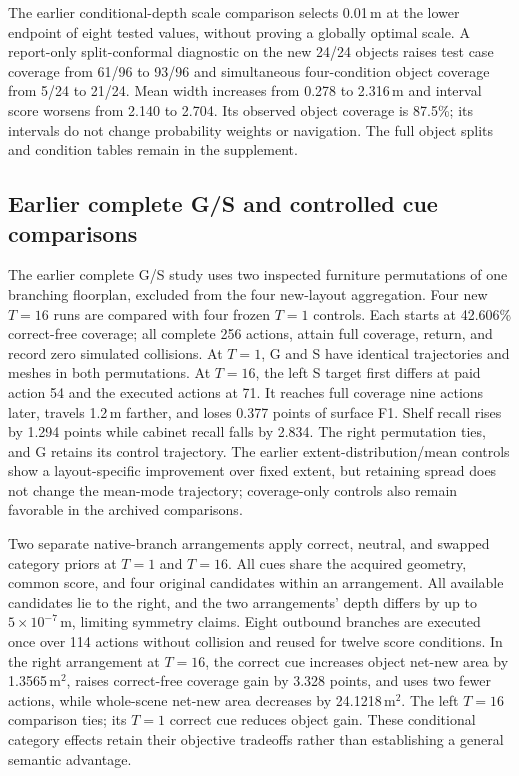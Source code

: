 The earlier conditional-depth scale comparison selects 0.01\,m at the lower endpoint of eight tested values, without proving a globally optimal scale. A report-only split-conformal diagnostic on the new 24/24 objects raises test case coverage from 61/96 to 93/96 and simultaneous four-condition object coverage from 5/24 to 21/24. Mean width increases from 0.278 to 2.316\,m and interval score worsens from 2.140 to 2.704. Its observed object coverage is 87.5\%; its intervals do not change probability weights or navigation. The full object splits and condition tables remain in the supplement.

\subsection{Earlier complete G/S and controlled cue comparisons}
The earlier complete G/S study uses two inspected furniture permutations of one branching floorplan, excluded from the four new-layout aggregation. Four new $T=16$ runs are compared with four frozen $T=1$ controls. Each starts at 42.606\% correct-free coverage; all complete 256 actions, attain full coverage, return, and record zero simulated collisions. At $T=1$, G and S have identical trajectories and meshes in both permutations. At $T=16$, the left S target first differs at paid action 54 and the executed actions at 71. It reaches full coverage nine actions later, travels 1.2\,m farther, and loses 0.377 points of surface F1. Shelf recall rises by 1.294 points while cabinet recall falls by 2.834. The right permutation ties, and G retains its control trajectory. The earlier extent-distribution/mean controls show a layout-specific improvement over fixed extent, but retaining spread does not change the mean-mode trajectory; coverage-only controls also remain favorable in the archived comparisons.


Two separate native-branch arrangements apply correct, neutral, and swapped category priors at $T=1$ and $T=16$. All cues share the acquired geometry, common score, and four original candidates within an arrangement. All available candidates lie to the right, and the two arrangements' depth differs by up to $5\times10^{-7}$\,m, limiting symmetry claims. Eight outbound branches are executed once over 114 actions without collision and reused for twelve score conditions. In the right arrangement at $T=16$, the correct cue increases object net-new area by 1.3565\,m$^2$, raises correct-free coverage gain by 3.328 points, and uses two fewer actions, while whole-scene net-new area decreases by 24.1218\,m$^2$. The left $T=16$ comparison ties; its $T=1$ correct cue reduces object gain. These conditional category effects retain their objective tradeoffs rather than establishing a general semantic advantage.

